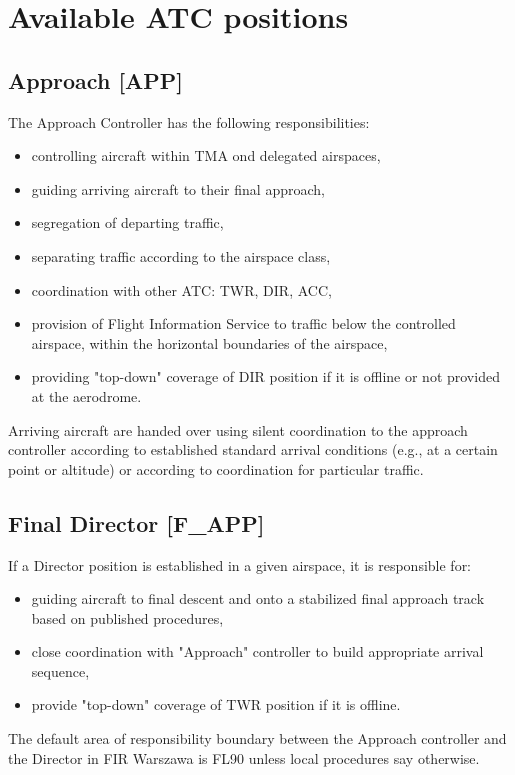 \chapter{Available ATC positions}
\section{Approach [APP]}
The Approach Controller has the following responsibilities:
\begin{itemize}
    \item controlling aircraft within TMA ond delegated airspaces,
    \item guiding arriving aircraft to their final approach,
    \item segregation of departing traffic,
    \item separating traffic according to the airspace class,
    \item coordination with other ATC: TWR, DIR, ACC,
    \item provision of Flight Information Service to traffic below the controlled airspace, within the horizontal boundaries of the airspace,
    \item providing "top-down" coverage of DIR position if it is offline or not provided at the aerodrome.
\end{itemize}

Arriving aircraft are handed over using silent coordination to the approach controller according to established standard arrival conditions (e.g., at a certain point or altitude) or according to coordination for particular traffic.

\section{Final Director [F\_APP]}
If a Director position is established in a given airspace, it is responsible for:
\begin{itemize}
    \item guiding aircraft to final descent and onto a stabilized final approach track based on published procedures,
    \item close coordination with "Approach" controller to build appropriate arrival sequence,
    \item provide "top-down" coverage of TWR position if it is offline.
\end{itemize}

The default area of responsibility boundary between the Approach controller and the Director in FIR Warszawa is FL90 unless local procedures say otherwise.

